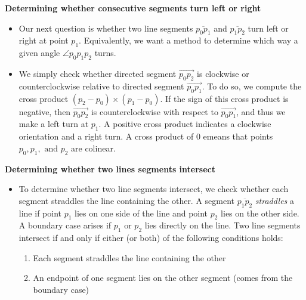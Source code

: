 \documentclass{report}
\begin{document}
\textbf{Determining whether consecutive segments turn left or right}
\begin{itemize}
    \item Our next question is whether two line segments $\overline{p_0p_1}$ and $\overline{p_1p_2}$ turn left or right at point $p_1$. Equivalently, we want a method to determine which way a given angle $\angle p_0p_1p_2$ turns.
    \item We simply check whether directed segment $\overrightarrow{p_0p_2}$ is clockwise or counterclockwise relative to directed segment $\overrightarrow{p_0p_1}$. To do so, we compute the cross product $(p_2 - p_0) \times (p_1 - p_0)$. If the sign of this cross product is negative, then $\overrightarrow{p_0p_2}$ is counterclockwise with respect to $\overrightarrow{p_0p_1}$, and thus we make a left turn at $p_1$. A positive cross product indicates a clockwise orientation and a right turn. A cross product of 0 emeans that points $p_0, p_1, \text{ and } p_2$ are colinear. 
\end{itemize}
\textbf{Determining whether two lines segments intersect}
\begin{itemize}
    \item To determine whether two line segments intersect, we check whether each segment straddles the line containing the other. A segment $\overline{p_1p_2}$ \textit{straddles} a line if point $p_1$ lies on one side of the line and point $p_2$ lies on the other side. A boundary case arises if $p_1$ or $p_2$ lies directly on the line. Two line segments intersect if and only if either (or both) of the following conditions holds:
    \begin{enumerate}
        \item Each segment straddles the line containing the other
        \item An endpoint of one segment lies on the other segment (comes from the boundary case)
    \end{enumerate}
\end{itemize}
\end{document}
